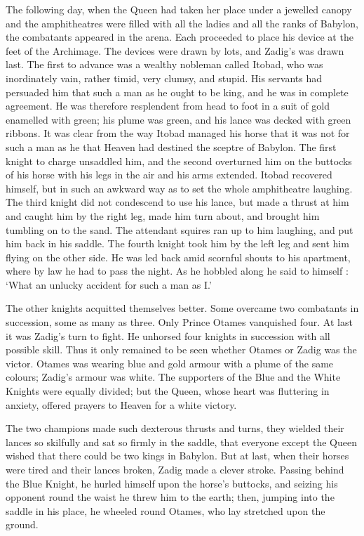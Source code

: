 \documentclass{article}
\begin{document}
\begin{center}
The following day, when the Queen had taken her place under a jewelled canopy and 
the amphitheatres were filled with all the ladies and all the ranks of Babylon, 
the combatants appeared in the arena. Each proceeded to place his device at the 
feet of the Archimage. The devices were drawn by lots, and Zadig's was drawn last. 
The first to advance was a wealthy nobleman called Itobad, who was inordinately 
vain, rather timid, very clumsy, and stupid. His servants had persuaded him that 
such a man as he ought to be king, and he was in complete agreement. He was therefore 
resplendent from head to foot in a suit of gold enamelled with green; his plume 
was green, and his lance was decked with green ribbons. It was clear from the way 
Itobad managed his horse that it was not for such a man as he that Heaven had destined 
the sceptre of Babylon. The first knight to charge unsaddled him, and the second 
overturned him on the buttocks of his horse with his legs in the air and his arms 
extended. Itobad recovered himself, but in such an awkward way as to set the whole 
amphitheatre laughing. The third knight did not condescend to use his lance, but 
made a thrust at him and caught him by the right leg, made him turn about, and 
brought him tumbling on to the sand. The attendant squires ran up to him laughing, 
and put him back in his saddle. The fourth knight took him by the left leg and 
sent him flying on the other side. He was led back amid scornful shouts to his 
apartment, where by law he had to pass the night. As he hobbled along he said to 
himself : `What an unlucky accident for such a man as I.' 

The other knights acquitted themselves better. Some overcame two combatants in 
succession, some as many as three. Only Prince Otames vanquished four. At last 
it was Zadig's turn to fight. He unhorsed four knights in succession with all possible 
skill. Thus it only remained to be seen whether Otames or Zadig was the victor. 
Otames was wearing blue and gold armour with a plume of the same colours; Zadig's 
armour was white. The supporters of the Blue and the White Knights were equally 
divided; but the Queen, whose heart was fluttering in anxiety, offered prayers 
to Heaven for a white victory. 

The two champions made such dexterous thrusts and turns, they wielded their lances 
so skilfully and sat so firmly in the saddle, that everyone except the Queen wished 
that there could be two kings in Babylon. But at last, when their horses were tired 
and their lances broken, Zadig made a clever stroke. Passing behind the Blue Knight, 
he hurled himself upon the horse's buttocks, and seizing his opponent round the 
waist he threw him to the earth; then, jumping into the saddle in his place, he 
wheeled round Otames, who lay stretched upon the ground. 


\end{center}
\end{document}
